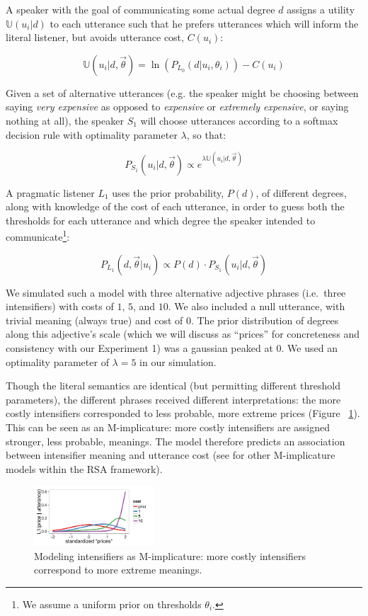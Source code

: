 \documentclass[10pt,letterpaper]{article}
\newcommand{\w}[1]{\emph{#1}}
\begin{document}
A speaker with the goal of communicating some actual degree $d$ assigns a utility $\mathbb{U}(u_i|d)$ to each utterance such that he prefers utterances which will inform the literal listener, but avoids utterance cost, $C(u_i)$:

$$\mathbb{U}(u_i | d, \vec{\theta}) =  \ln\left(P_{L_0}(d | u_i, \theta_i) \right) - C(u_i) $$

Given a set of alternative utterances (e.g. the speaker might be choosing between saying \w{very expensive} as opposed to \w{expensive} or \w{extremely expensive}, or saying nothing at all), the speaker $S_1$ will choose utterances according to a softmax decision rule \cite{sutton_reinforcement_2011} with optimality parameter $\lambda$, so that:

$$ P_{S_1}(u_i | d, \vec{\theta}) \propto e^{\lambda \mathbb{U}(u_i | d, \vec{\theta})} $$

A pragmatic listener $L_1$ uses the prior probability, $P(d)$, of different degrees, along with knowledge of the cost of each utterance, in order to guess both the thresholds for each utterance and which degree the speaker intended to communicate\footnote{We assume a uniform prior on thresholds $\theta_i$.}:

$$ P_{L_1}(d, \vec{\theta} | u_i) \propto P(d) \cdot P_{S_1}(u_i | d, \vec{\theta}) $$

We simulated such a model with three alternative adjective phrases (i.e.~three intensifiers) with costs of $1$, $5$, and $10$. We also included a null utterance, with trivial meaning (always true) and cost of $0$. The prior distribution of degrees along this adjective's scale (which we will discuss as ``prices'' for concreteness and consistency with our Experiment 1) was a gaussian peaked at $0$.
We used an optimality parameter of $\lambda=5$ in our simulation. 

Though the literal semantics are identical (but permitting different threshold parameters), the different phrases received different interpretations: the more costly intensifiers corresponded to less probable, more extreme prices (Figure ~\ref{model}).
This can be seen as an M-implicature: more costly intensifiers are assigned stronger, less probable, meanings. 
The model therefore predicts an association between intensifier meaning and utterance cost (see  for other M-implicature models within the RSA framework).

\begin{figure}[tbh]
\begin{center}
\includegraphics[width=0.4\textwidth]{model_results.pdf}
\end{center}
\caption{Modeling intensifiers as M-implicature: more costly intensifiers correspond to more extreme meanings.} 
\label{model}
\end{figure}
\end{document}
